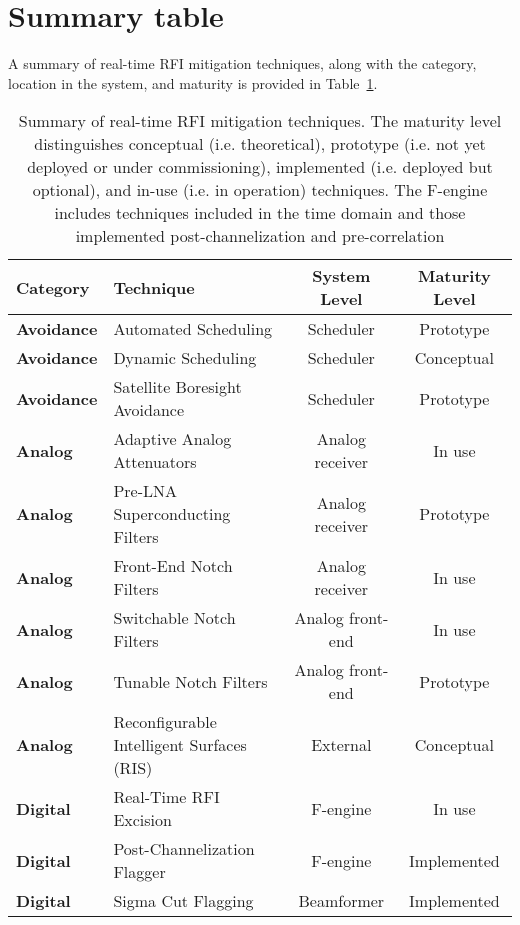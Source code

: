 \section{Summary table} %
\label{section:hardware:summary}

A summary of real-time RFI mitigation techniques, along with the category, location in the system, and maturity is provided in Table~\ref{real-time-tech}.
\begin{table}
  \begin{center}
  \caption{Summary of real-time RFI mitigation techniques. The maturity level distinguishes conceptual (i.e. theoretical), prototype (i.e. not yet deployed or under commissioning), implemented (i.e. deployed but optional), and in-use (i.e. in operation) techniques. The F-engine includes techniques included in the time domain and those implemented post-channelization and pre-correlation}
 \label{real-time-tech}
 {\scriptsize
\begin{tabular}{|l|l|c|c|} \hline 
{\bf Category} & {\bf Technique} & {\bf System Level} & {\bf Maturity Level} \\ 
\hline
\textbf{Avoidance} & Automated Scheduling & Scheduler & Prototype \\ \hline
\textbf{Avoidance} & Dynamic Scheduling & Scheduler & Conceptual \\ \hline
\textbf{Avoidance} & Satellite Boresight Avoidance & Scheduler & Prototype \\ \hline
\textbf{Analog} & Adaptive Analog Attenuators & Analog receiver & In use \\ \hline
\textbf{Analog} & Pre-LNA Superconducting Filters & Analog receiver & Prototype \\ \hline
\textbf{Analog} & Front-End Notch Filters & Analog receiver & In use \\ \hline
\textbf{Analog} & Switchable Notch Filters & Analog front-end & In use \\ \hline
\textbf{Analog} & Tunable Notch Filters & Analog front-end & Prototype \\ \hline
\textbf{Analog} & Reconfigurable Intelligent Surfaces (RIS) & External & Conceptual \\ \hline
\textbf{Digital} & Real-Time RFI Excision & F-engine & In use \\ \hline
\textbf{Digital} & Post-Channelization Flagger & F-engine & Implemented \\ \hline
\textbf{Digital} & Sigma Cut Flagging & Beamformer & Implemented \\ \hline

\end{tabular}}
\end{center}
\end{table}
